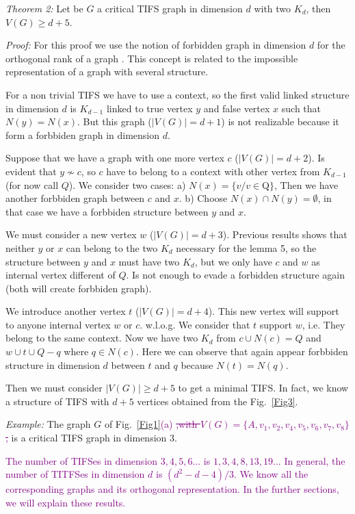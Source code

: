 \documentclass[%
  twocolumn,
 showpacs,
 showkeys,
 preprintnumbers,
 amsmath,amssymb,
 aps,
  pra,
  longbibliography,
 floatfix,
 ]{revtex4-1}
\newcommand{\jr}[1]{\textcolor{purple}{#1}}
\def\endproof{ }
\begin{document}
{\em Theorem 2:} Let be $G$ a critical TIFS graph in dimension $d$ with two $K_d$, then $V(G) \geq d+5$.


{\em Proof:} For this proof we use the notion of forbidden graph in dimension $d$ for the orthogonal rank of a graph \cite{code21}. This concept is related to the impossible representation of a graph with several structure.

For a non trivial TIFS we have to use a context, so the first valid linked structure in dimension $d$ is $K_{d-1}$ linked to true vertex $y$ and false vertex $x$ such that $N(y) = N(x)$. But this graph ($|V(G)| = d+1$) is not realizable because it form a forbbiden graph in dimension $d$.

Suppose that we have a graph with one more vertex $c$ ($|V(G)| = d+2$). Is evident that $y \nsim c$, so $c$ have to belong to a context with other vertex from $K_{d-1}$ (for now call $Q$). We consider two cases: a) $N(x) = \{v / v \in $Q$\}$, Then we have another forbbiden graph between $c$ and $x$. b) Choose $N(x) \cap N(y) = \emptyset$, in that case we have a forbbiden structure between $y$ and $x$.

We must consider a new vertex $w$ ($|V(G)| = d+3$). Previous results shows that neither $y$ or $x$ can belong to the two $K_d$ necessary for the lemma 5, so the structure between $y$ and $x$ must have two $K_d$, but we only have $c$ and $w$ as internal vertex different of $Q$. Is not enough to evade a forbidden structure again (both will create forbbiden graph).

We introduce another vertex $t$ ($|V(G)| = d+4$). This new vertex will support to anyone internal vertex $w$ or $c$. w.l.o.g. We consider that $t$ support $w$, i.e. They belong to the same context. Now we have two $K_d$ from $c \cup N(c)=Q$ and $w \cup t \cup Q-{q}$ where $q \in N(c)$. Here we can observe that again appear forbbiden structure in dimension $d$ between $t$ and $q$ because $N(t) = N(q)$.

Then we must consider $|V(G)| \geq d+5$ to get a minimal TIFS. In fact, we know a structure of TIFS with $d+5$ vertices
obtained from the Fig.~\ref{Fig3}. \endproof

{\em Example:} The graph $G$ of Fig.~\ref{Fig1}\jr{(a) \sout{,with $V(G) = \{A,v_1,v_2,v_4,v_5,v_6,v_7, v_8\}$,}} is a critical TIFS graph in dimension 3.

\jr{The number of TIFSes in dimension $3,4,5,6...$ is $1,3,4,8,13,19...$
In general, the number of TITFSes in dimension $d$ is $(d^2-d-4)/3$.
We know all the corresponding graphs and its orthogonal representation. In the further sections, we will explain these results.}
\end{document}
